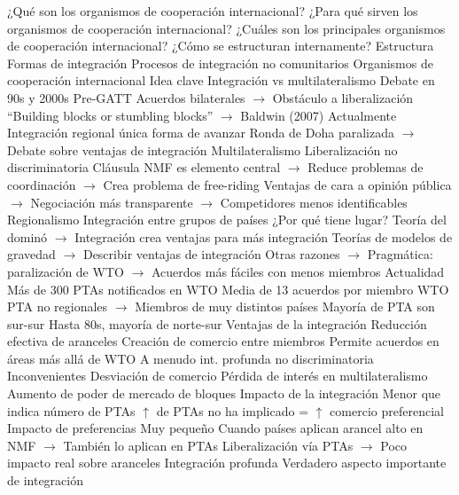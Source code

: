 \documentclass{nuevotema}
\begin{document}
\begin{esquemal}
			\3 ¿Qué son los organismos de cooperación internacional?
			\3 ¿Para qué sirven los organismos de cooperación internacional?
			\3 ¿Cuáles son los principales organismos de cooperación internacional?
			\3 ¿Cómo se estructuran internamente?
		\2 Estructura
			\3 Formas de integración
			\3 Procesos de integración no comunitarios
			\3 Organismos de cooperación internacional
	\1 
		\2 Idea clave
			\3 Integración vs multilateralismo
				\4 Debate en 90s y 2000s
				\4[] Pre-GATT
				\4[] Acuerdos bilaterales
				\4[] $\to$ Obstáculo a liberalización
				\4[] ``Building blocks or stumbling blocks''
				\4[] $\to$ Baldwin (2007)
				\4 Actualmente
				\4[] Integración regional única forma de avanzar
				\4[] Ronda de Doha paralizada
				\4[] $\to$ Debate sobre ventajas de integración
				\4 Multilateralismo
				\4[] Liberalización no discriminatoria
				\4[] Cláusula NMF es elemento central
				\4[] $\to$ Reduce problemas de coordinación
				\4[] $\to$ Crea problema de free-riding
				\4[] Ventajas de cara a opinión pública
				\4[] $\to$ Negociación más transparente
				\4[] $\to$ Competidores menos identificables
				\4 Regionalismo
				\4[] Integración entre grupos de países
				\4[] ¿Por qué tiene lugar?
				\4[] Teoría del dominó
				\4[] $\to$ Integración crea ventajas para más integración
				\4[] Teorías de modelos de gravedad
				\4[] $\to$ Describir ventajas de integración
				\4[] Otras razones
				\4[] $\to$ Pragmática: paralización de WTO
				\4[] $\to$ Acuerdos más fáciles con menos miembros
				\4 Actualidad
				\4[] Más de 300 PTAs notificados en WTO
				\4[] Media de 13 acuerdos por miembro WTO
				\4[] PTA no regionales
				\4[] $\to$ Miembros de muy distintos países
				\4[] Mayoría de PTA son sur-sur
				\4[] Hasta 80s, mayoría de norte-sur
			\3 Ventajas de la integración
				\4 Reducción efectiva de aranceles
				\4 Creación de comercio entre miembros
				\4 Permite acuerdos en áreas más allá de WTO
				\4[] A menudo int. profunda no discriminatoria
			\3 Inconvenientes
				\4 Desviación de comercio
				\4 Pérdida de interés en multilateralismo
				\4 Aumento de poder de mercado de bloques
			\3 Impacto de la integración
				\4 Menor que indica número de PTAs
				\4[] $\uparrow$ de PTAs no ha implicado = $\uparrow$ comercio preferencial
				\4 Impacto de preferencias
				\4[] Muy pequeño
				\4[] Cuando países aplican arancel alto en NMF
				\4[] $\to$ También lo aplican en PTAs
				\4[] Liberalización vía PTAs
				\4[] $\to$ Poco impacto real sobre aranceles
				\4 Integración profunda
				\4[] Verdadero aspecto importante de integración

\end{esquemal}
\end{document}
